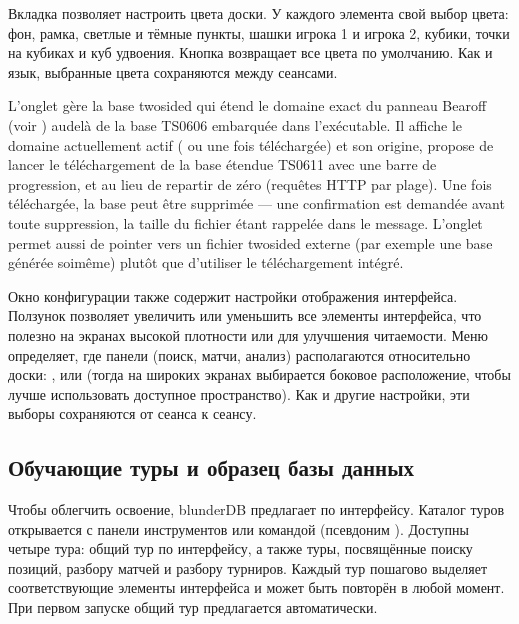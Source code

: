 \documentclass[letterpaper,10pt,russian]{sphinxmanual}
\begin{document}
\sphinxAtStartPar
Вкладка  позволяет настроить цвета доски. У каждого элемента свой выбор цвета: фон, рамка, светлые и тёмные пункты, шашки игрока 1 и игрока 2, кубики, точки на кубиках и куб удвоения. Кнопка  возвращает все цвета по умолчанию. Как и язык, выбранные цвета сохраняются между сеансами.

\sphinxAtStartPar
L’onglet  gère la base two\sphinxhyphen{}sided qui étend le domaine exact du
panneau Bearoff (voir {\hyperref[\detokenize{manuel:panneau-epc}]{}}) au\sphinxhyphen{}delà de la base TS\sphinxhyphen{}06\sphinxhyphen{}06
embarquée dans l’exécutable. Il affiche le domaine actuellement actif
( ou  une fois téléchargée) et son origine, propose de
lancer le téléchargement de la base étendue TS\sphinxhyphen{}06\sphinxhyphen{}11 avec une barre de
progression, et  au
lieu de repartir de zéro (requêtes HTTP par plage). Une fois téléchargée, la
base peut être supprimée — une confirmation est demandée avant toute
suppression, la taille du fichier étant rappelée dans le message. L’onglet
permet aussi de pointer vers un fichier  two\sphinxhyphen{}sided externe (par exemple
une base générée soi\sphinxhyphen{}même) plutôt que d’utiliser le téléchargement intégré.

\sphinxAtStartPar
Окно конфигурации также содержит настройки отображения интерфейса. Ползунок  позволяет увеличить или уменьшить все элементы интерфейса, что полезно на экранах высокой плотности или для улучшения читаемости. Меню  определяет, где панели (поиск, матчи, анализ) располагаются относительно доски: ,  или  (тогда на широких экранах выбирается боковое расположение, чтобы лучше использовать доступное пространство). Как и другие настройки, эти выборы сохраняются от сеанса к сеансу.


\subsection{Обучающие туры и образец базы данных}
\label{\detokenize{manuel:visites-guidees-et-base-d-exemple}}\label{\detokenize{manuel:visites-guidees}}
\sphinxAtStartPar
Чтобы облегчить освоение, blunderDB предлагает  по интерфейсу. Каталог туров открывается с панели инструментов или командой  (псевдоним ). Доступны четыре тура: общий тур по интерфейсу, а также туры, посвящённые поиску позиций, разбору матчей и разбору турниров. Каждый тур пошагово выделяет соответствующие элементы интерфейса и может быть повторён в любой момент. При первом запуске общий тур предлагается автоматически.
\end{document}
